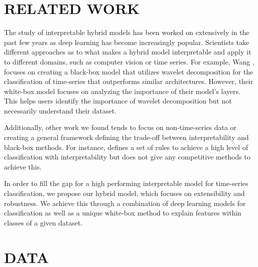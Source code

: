 \documentclass{turabian-thesis}[12pt]
\begin{document}
\chapter{RELATED WORK}
\label{chap:relatedwork}

The study of interpretable hybrid models has been worked on extensively in the past few years as deep learning has become increasingly popular. Scientists take different approaches as to what makes a hybrid model interpretable and apply it to different domains, such as computer vision or time series. For example, Wang \cite{wang_multilevel_2018}, focuses on creating a black-box model that utilizes wavelet decomposition for the classification of time-series that outperforms similar architectures. However, their white-box model focuses on analyzing the importance of their model's layers. This helps users identify the importance of wavelet decomposition but not necessarily understand their dataset. 

Additionally, other work we found tends to focus on non-time-series data or creating a general framework defining the trade-off between interpretability and black-box methods. For instance, \cite{wang_hybrid_2019} defines a set of rules to achieve a high level of classification with interpretability but does not give any competitive methods to achieve this. 

In order to fill the gap for a high performing interpretable model for time-series classification, we propose our hybrid model, which focuses on extensibility and robustness. We achieve this through a combination of deep learning models for classification as well as a unique white-box method to explain features within classes of a given dataset.




\chapter{DATA}
\end{document}
